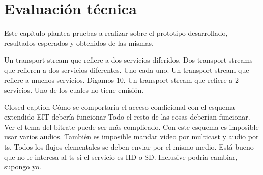 \ifx\all\undefined


\fi

\chapter{Evaluaci\'on t\'ecnica}

Este capítulo plantea pruebas a realizar sobre el prototipo desarrollado, resultados esperados y obtenidos de las mismas.

Un transport stream que refiere a dos servicios diferidos.
Dos transport streams que refieren a dos servicios diferentes. Uno cada uno.
Un transport stream que refiere a muchos servicios. Digamos 10.
Un transport stream que refiere a 2 servicios. Uno de los cuales no tiene emisión.


Closed caption
Cómo se comportaría el acceso condicional con el esquema extendido
EIT debería funcionar
Todo el resto de las cosas deberían funcionar. Ver el tema del bitrate puede ser más complicado.
Con este esquema es imposible usar varios audios.
También es imposible mandar video por multicast y audio por ts.
Todos los flujos elementales se deben enviar por el mismo medio.
Está bueno que no le interesa al ts si el servicio es HD o SD. Inclusive podría cambiar, supongo yo.

\ifx\all\undefined

\fi